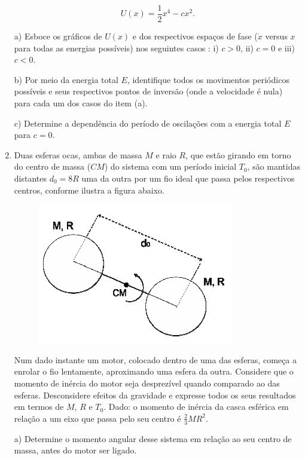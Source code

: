 \begin{enumerate}[start=1,label={\bfseries Q\arabic*.}]
$$
U(x) = \frac{1}{2} x^{4} - c x^{2}.
$$


a) Esboce os gráficos de $U(x)$ e dos respectivos espaços de fase ($\dot{x}$ versus $x$ para todas as energias possíveis) nos seguintes casos : i) $c > 0$, ii) $c = 0$ e iii) $c < 0$.

\resposta

b) Por meio da energia total $E$, identifique todos os movimentos periódicos possíveis e seus respectivos pontos de inversão (onde a velocidade é nula) para cada um dos casos do item (a).

\resposta

c) Determine a dependência do período de oscilações com a energia total $E$ para $c = 0$.

\resposta



\item Duas esferas ocas, ambas de massa $M$ e raio $R$, que estão girando em torno do centro de massa ($CM$) do sistema com um período inicial $T_{0}$, são mantidas distantes $d_{0} = 8R$ uma da outra por um fio ideal que passa pelos respectivos centros, conforme ilustra a figura abaixo.

\begin{figure}[H]
\centering
\includegraphics[scale=0.8]{classica-img/rotacional.png}
\end{figure}

Num dado instante um motor, colocado dentro de uma das esferas, começa a enrolar o fio lentamente, aproximando uma esfera da outra. Considere que o momento de inércia do motor seja desprezível quando comparado ao das esferas. Desconsidere efeitos da gravidade e expresse todos os seus resultados em termos de $M$, $R$ e $T_{0}$. Dado: o momento de inércia da casca esférica em relação a um eixo que passa pelo seu centro é $\frac{2}{3} MR^{2}$.

a) Determine o momento angular desse sistema em relação ao seu centro de massa, antes do motor ser ligado.


\end{enumerate}
